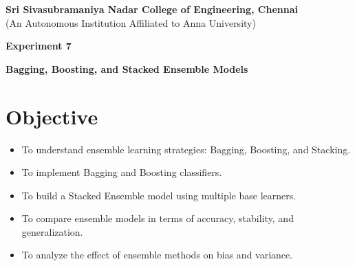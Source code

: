 \documentclass[11pt]{article}
\begin{document}
\begin{center}
    \large \textbf{Sri Sivasubramaniya Nadar College of Engineering, Chennai} \\
    (An Autonomous Institution Affiliated to Anna University) \\
    \vspace{0.3cm}
\end{center}

\begin{table}[!h]
\renewcommand{\arraystretch}{1.5}
\end{table}
\begin{center}
    \textbf{\Large Experiment 7}
\end{center}

\begin{center}
    \textbf{Bagging, Boosting, and Stacked Ensemble Models}
\end{center}

\section{Objective}
\begin{itemize}
    \item To understand ensemble learning strategies: Bagging, Boosting, and Stacking.
    \item To implement Bagging and Boosting classifiers.
    \item To build a Stacked Ensemble model using multiple base learners.
    \item To compare ensemble models in terms of accuracy, stability, and generalization.
    \item To analyze the effect of ensemble methods on bias and variance.
\end{itemize}
\end{document}
